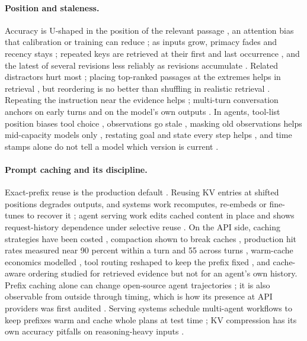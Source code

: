 \paragraph{Position and staleness.} Accuracy is U-shaped in the position of the relevant passage \citep{a2307_03172}, an attention bias that calibration or training can reduce \citep{a2406_16008,a2404_16811}; as inputs grow, primacy fades and recency stays \citep{a2508_07479}; repeated keys are retrieved at their first and last occurrence \citep{a2510_22752}, and the latest of several revisions less reliably as revisions accumulate \citep{a2603_12271}. Related distractors hurt most \citep{a2401_14887}; placing top-ranked passages at the extremes helps in retrieval \citep{a2410_05983}, but reordering is no better than shuffling in realistic retrieval \citep{a2505_15561}. Repeating the instruction near the evidence helps \citep{a2403_05004,a2308_12097,a2308_10882}; multi-turn conversation anchors on early turns and on the model's own outputs \citep{a2505_06120}. In agents, tool-list position biases tool choice \citep{a2505_18135}, observations go stale \citep{a2610_05281}, masking old observations helps mid-capacity models only \citep{a2606_00408}, restating goal and state every step helps \citep{a2410_02810,a2610_01415}, and time stamps alone do not tell a model which version is current \citep{a2602_01313}.

\paragraph{Prompt caching and its discipline.} Exact-prefix reuse is the production default \citep{a2312_07104,a2311_04934}. Reusing KV entries at shifted positions degrades outputs, and systems work recomputes, re-embeds or fine-tunes to recover it \citep{a2405_16444,a2410_15332,a2409_15355,a2502_05431,a2502_16002,a2502_15734,a2512_23049}; agent serving work edits cached content in place \citep{a2606_01065,a2605_05696} and shows request-history dependence under selective reuse \citep{a2610_05833}. On the API side, caching strategies have been costed \citep{a2601_06007}, compaction shown to break caches \citep{a2607_15516,a2606_17016,a2609_00749}, production hit rates measured near 90 percent within a turn and 55 across turns \citep{a2608_00101}, warm-cache economics modelled \citep{a2607_19214}, tool routing reshaped to keep the prefix fixed \citep{a2608_22708}, and cache-aware ordering studied for retrieved evidence \citep{a2606_19667,a2609_13692} but not for an agent's own history. Prefix caching alone can change open-source agent trajectories \citep{a2609_04748}; it is also observable from outside through timing, which is how its presence at API providers was first audited \citep{a2502_07776}. Serving systems schedule multi-agent workflows to keep prefixes warm \citep{a2507_07400} and cache whole plans at test time \citep{a2506_14852}; KV compression has its own accuracy pitfalls on reasoning-heavy inputs \citep{a2510_00231}.

